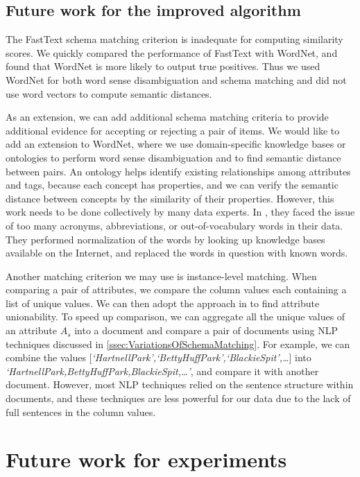 \subsection{Future work for the improved algorithm}

The FastText schema matching criterion is inadequate for computing similarity scores. We quickly compared the performance of FastText with WordNet, and found that WordNet is more likely to output true positives. Thus we used WordNet for both word sense disambiguation and schema matching and did not use word vectors to compute semantic distances.

As an extension, we can add additional schema matching criteria to provide additional evidence for accepting or rejecting a pair of items. We would like to add an extension to WordNet, where we use domain-specific knowledge bases or ontologies to perform word sense disambiguation and to find semantic distance between pairs. An ontology helps identify existing relationships among attributes and tags, because each concept has properties, and we can verify the semantic distance between concepts by the similarity of their properties. However, this work needs to be done collectively by many data experts. In \cite{Sorrentino2011NORMS}, they faced the issue of too many acronyms, abbreviations, or out-of-vocabulary words in their data. They performed normalization of the words by looking up knowledge bases available on the Internet, and replaced the words in question with known words.

Another matching criterion we may use is instance-level matching. When comparing a pair of attributes, we compare the column values each containing a list of unique values. We can then adopt the approach in \cite{Nargesian2018Table} to find attribute unionability. To speed up comparison, we can aggregate all the unique values of an attribute $A_s$ into a document and compare a pair of documents using NLP techniques discussed in \autoref{ssec:VariationsOfSchemaMatching}. For example, we can combine the values [\textit{`HartnellPark',`BettyHuffPark',`BlackieSpit',\ldots}] into\\ \textit{`HartnellPark,BettyHuffPark,BlackieSpit,\ldots'}, and compare it with another document. However, most NLP techniques relied on the sentence structure within documents, and these techniques are less powerful for our data due to the lack of full sentences in the column values.

\section{Future work for experiments}
\label{sec:FutureWorkForExperiments}

